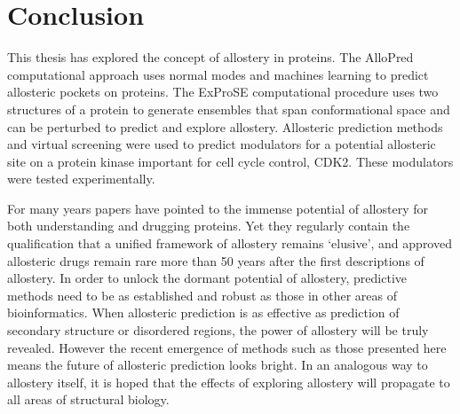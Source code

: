 \chapter{Conclusion}
\label{cha:conclusion}

This thesis has explored the concept of allostery in proteins.
The AlloPred computational approach uses normal modes and machines learning to predict allosteric pockets on proteins.
The ExProSE computational procedure uses two structures of a protein to generate ensembles that span conformational space and can be perturbed to predict and explore allostery.
Allosteric prediction methods and virtual screening were used to predict modulators for a potential allosteric site on a protein kinase important for cell cycle control, CDK2.
These modulators were tested experimentally.

For many years papers have pointed to the immense potential of allostery for both understanding and drugging proteins.
Yet they regularly contain the qualification that a unified framework of allostery remains `elusive', and approved allosteric drugs remain rare more than 50 years after the first descriptions of allostery.
In order to unlock the dormant potential of allostery, predictive methods need to be as established and robust as those in other areas of bioinformatics.
When allosteric prediction is as effective as prediction of secondary structure or disordered regions, the power of allostery will be truly revealed.
However the recent emergence of methods such as those presented here means the future of allosteric prediction looks bright.
In an analogous way to allostery itself, it is hoped that the effects of exploring allostery will propagate to all areas of structural biology.
